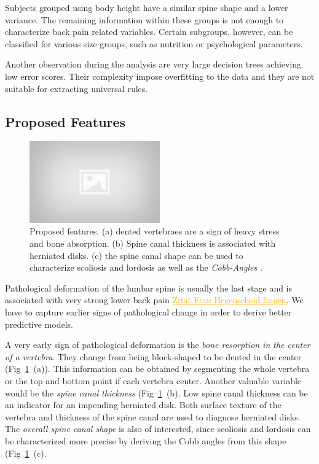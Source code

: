 \documentclass[a4paper,twoside]{style/article}
\newcommand{\com}[1]{\textcolor{orange}{\uline{#1}}}
\begin{document}
Subjects grouped using body height have a similar spine shape and a lower variance.
The remaining information within these groups is not enough to characterize back pain related variables.
Certain subgroups, however, can be classified for various size groups, such as nutrition or psychological parameters.

Another observation during the analysis are very large decision trees achieving low error scores.
Their complexity impose overfitting to the data and they are not suitable for extracting universal rules.
\subsection{Proposed Features}
\label{sec:ProposedFeatures}
\begin{figure}[!h]
  \centering
  \includegraphics[width=0.5\textwidth]{figures/placeholder}
  \caption{Proposed features. (a) dented vertebraes are a sign of heavy stress and bone absorption. (b) Spine canal thickness is associated with herniated disks. (c) the spine canal shape can be used to characterize scoliosis and lordosis as well as the \emph{Cobb-Angles} \cite{Cobb}. }
  \label{fig:proposedFeatures}
\end{figure}
\noindent Pathological deformation of the lumbar spine is usually the last stage and is associated with very strong lower back pain \com{Zitat Frau Hegenscheid fragen}.
We have to capture earlier signs of pathological change in order to derive better predictive models.

A very early sign of pathological deformation is the \emph{bone resorption in the center of a vertebra}.
They change from being block-shaped to be dented in the center (Fig~\ref{fig:proposedFeatures}~(a)).
This information can be obtained by segmenting the whole vertebra or the top and bottom point if each vertebra center.
Another valuable variable would be the \emph{spine canal thickness} (Fig~\ref{fig:proposedFeatures}~(b).
Low spine canal thickness can be an indicator for an impending herniated disk.
Both surface texture of the vertebra and thickness of the spine canal are used to diagnose herniated disks.
The \emph{overall spine canal shape} is also of interested, since scoliosis and lordosis can be characterized more precise by deriving the Cobb angles from this shape (Fig~\ref{fig:proposedFeatures}~(c).
\end{document}
